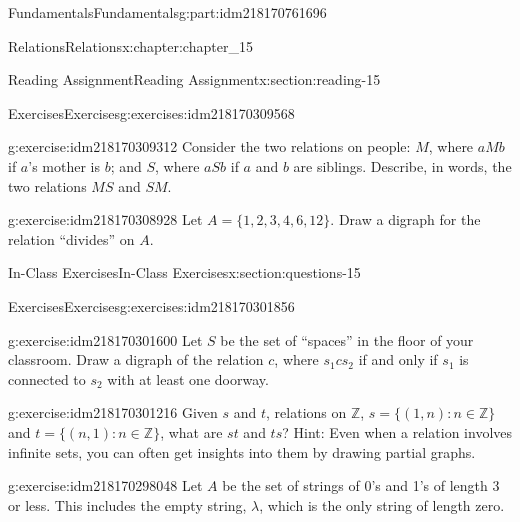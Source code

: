 \documentclass[oneside,10pt,]{book}
\numberwithin{equation}{section}
\begin{document}
\begin{partptx}{Fundamentals}{}{Fundamentals}{}{}{g:part:idm218170761696}
\begin{chapterptx}{Relations}{}{Relations}{}{}{x:chapter:chapter_15}
\begin{sectionptx}{Reading Assignment}{}{Reading Assignment}{}{}{x:section:reading-15}
\begin{exercises-subsection-numberless}{Exercises}{}{Exercises}{}{}{g:exercises:idm218170309568}
\begin{exercisegroup}
\begin{divisionexerciseeg}{1}{}{}{g:exercise:idm218170309312}
Consider the two relations on people: \(M\), where \(aMb\) if \(a\)'s mother is \(b\); and \(S\), where  \(aSb\) if \(a\) and \(b\) are siblings.  Describe, in words, the two relations \(MS\) and \(SM\).%
\end{divisionexerciseeg}%
\begin{divisionexerciseeg}{2}{}{}{g:exercise:idm218170308928}%
Let \(A = \{1,2,3,4,6,12\}\).  Draw a digraph for the relation ``divides'' on \(A\).%
\end{divisionexerciseeg}%
\end{exercisegroup}
\par\medskip\noindent
\end{exercises-subsection-numberless}
\end{sectionptx}
%
%
\typeout{************************************************}
\typeout{************************************************}
%
\begin{sectionptx}{In-Class Exercises}{}{In-Class Exercises}{}{}{x:section:questions-15}
%
%
%
\typeout{************************************************}
\typeout{************************************************}
%
\begin{exercises-subsection-numberless}{Exercises}{}{Exercises}{}{}{g:exercises:idm218170301856}
\par\medskip\noindent%
%
\begin{exercisegroup}
\begin{divisionexerciseeg}{1}{}{}{g:exercise:idm218170301600}%
Let \(S\) be the set of ``spaces'' in the floor of your classroom.   Draw a digraph of the relation \(c\), where \(s_1 c s_2\) if and only if \(s_1\) is connected to \(s_2\) with at least one doorway.%
\end{divisionexerciseeg}%
\begin{divisionexerciseeg}{2}{}{}{g:exercise:idm218170301216}%
Given \(s\) and \(t\), relations on \(\mathbb{Z}\), \(s = \{(1, n) : n \in \mathbb{Z}\}\) and \(t= \{(n, 1) : n \in  \mathbb{Z}\}\), what are \(st\) and \(ts\)? Hint: Even when a relation involves infinite sets, you can often get insights into them by drawing partial graphs.%
\end{divisionexerciseeg}%
\begin{divisionexerciseeg}{3}{}{}{g:exercise:idm218170298048}%
Let \(A\) be the set of strings of 0's and 1's of length 3 or less.  This includes the empty string, \(\lambda\), which is the only string of length zero.%
\begin{enumerate}[label=(\alph*)]

\end{enumerate}
\end{divisionexerciseeg}
\end{exercisegroup}
\end{exercises-subsection-numberless}
\end{sectionptx}
\end{chapterptx}
\end{partptx}
\end{document}
